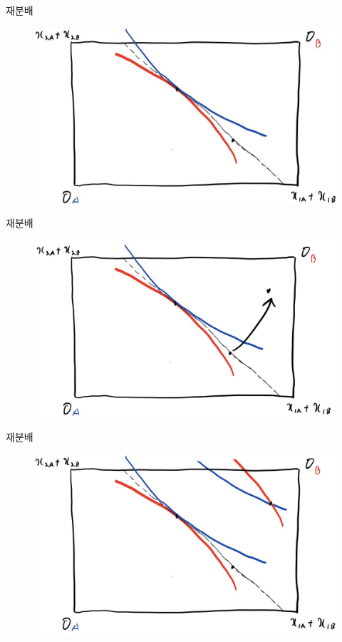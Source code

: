 \documentclass[aspectratio=169,xcolor=dvipsnames,handout]{beamer}
\begin{document}
\begin{frame}{재분배}
    \begin{figure}
        \centering
        \includegraphics[scale=.3]{pic/trans1.jpg}
    \end{figure}
\end{frame}

\begin{frame}{재분배}
    \begin{figure}
        \centering
        \includegraphics[scale=.3]{pic/trans2.jpg}
    \end{figure}
\end{frame}

\begin{frame}{재분배}
    \begin{figure}
        \centering
        \includegraphics[scale=.3]{pic/trans3.jpg}
    \end{figure}
\end{frame}
\end{document}
